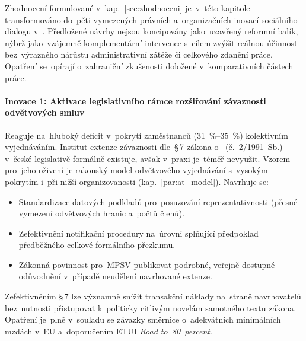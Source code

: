 
Zhodnocení formulované v~kap.~\ref{sec:zhodnoceni} je~v~této kapitole transformováno do~pěti vymezených právních a~organizačních inovací sociálního dialogu v~. Předložené návrhy nejsou koncipovány jako~uzavřený reformní balík, nýbrž jako~vzájemně komplementární intervence s~cílem zvýšit reálnou účinnost  bez~výrazného nárůstu administrativní zátěže či celkového zdanění práce. Opatření se~opírají o~zahraniční zkušenosti doložené v~komparativních částech práce.~\cite{InovacniDoporuceni_ZahraniceKV}\par

\paragraph{Inovace 1: Aktivace legislativního rámce rozšiřování závaznosti odvětvových smluv}\label{par:inovace_ksvs}
Reaguje na~hluboký deficit v~pokrytí zaměstnanců (\SI{31}{\percent}--\SI{35}{\percent}) kolektivním vyjednáváním. Institut extenze závaznosti  dle~\mbox{§\,7} zákona o~ (č.~2/1991~Sb.) v~české legislativě formálně existuje, avšak v~praxi je~téměř nevyužit. Vzorem pro~jeho oživení je rakouský model odvětvového vyjednávání s~vysokým pokrytím i~při nižší organizovanosti (kap.~\ref{par:at_model}). Navrhuje se:
\begin{itemize}[noitemsep]
  \item Standardizace datových podkladů pro~posuzování reprezentativnosti (přesné vymezení odvětvových hranic a~počtů členů).
  \item Zefektivnění notifikační procedury na~úrovni  splňující předpoklad předběžného celkové formálního přezkumu.
  \item Zákonná povinnost pro~\acs{MPSV} publikovat podrobné, veřejně dostupné odůvodnění v~případě neudělení navrhované extenze.
\end{itemize}
Zefektivněním \mbox{§\,7} lze významně snížit transakční náklady na~straně navrhovatelů bez~nutnosti přistupovat k~politicky citlivým novelám samotného textu zákona. Opatření je~plně v~souladu se závazky směrnice o~adekvátních minimálních mzdách v~\acs{EU} a~doporučením \acs{ETUI} \emph{Road to~80~percent}.~\cite{eu_directive_2022_2041}~\cite{ETUI_RoadTo80_Muller_2025}\par
\newpage
